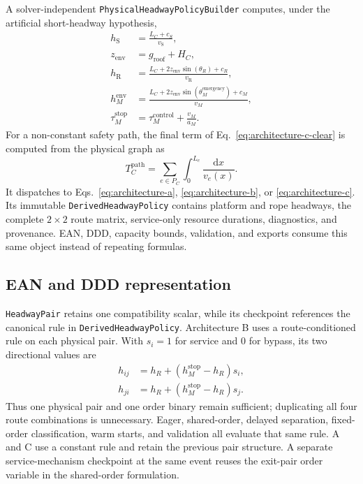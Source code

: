 \documentclass[11pt,a4paper]{scrartcl}
\newcommand{\vlinehaul}{v_{\mathrm R}}
\newcommand{\vstation}{v_{\mathrm S}}
\newcommand{\hlinehaul}{h_{\mathrm R}}
\newcommand{\hservice}{h_{\mathrm S}}
\begin{document}
A solver-independent \texttt{PhysicalHeadwayPolicyBuilder} computes, under the
artificial short-headway hypothesis,
\begin{align*}
\hservice &= \frac{L_C+c_S}{\vstation},\\
z_{\mathrm{env}} &= g_{\mathrm{roof}}+H_C,\\
\hlinehaul &= \frac{L_C+2z_{\mathrm{env}}\sin(\theta_R)+c_R}{\vlinehaul},\\
 h_M^{\mathrm{env}}
 &=\frac{L_C+2z_{\mathrm{env}}\sin(\theta_M^{\mathrm{emergency}})+c_M}{v_M},\\
\tau_M^{\mathrm{stop}}
 &=\tau_M^{\mathrm{control}}+\frac{v_M}{a_M}.
\end{align*}
For a non-constant safety path, the final term of
Eq.~\eqref{eq:architecture-c-clear} is computed from the physical graph as
\[
T_C^{\mathrm{path}}
=\sum_{e\in P_C}\int_0^{L_e}\frac{\mathrm dx}{v_e(x)}.
\]
It dispatches to Eqs.~\eqref{eq:architecture-a},
\eqref{eq:architecture-b}, or \eqref{eq:architecture-c}.  Its immutable
\texttt{DerivedHeadwayPolicy} contains platform and rope headways, the complete
$2\times2$ route matrix, service-only resource durations, diagnostics, and
provenance.  EAN, DDD, capacity bounds, validation, and exports consume this
same object instead of repeating formulas.

\subsection{EAN and DDD representation}

\texttt{HeadwayPair} retains one compatibility scalar, while its checkpoint
references the canonical rule in \texttt{DerivedHeadwayPolicy}.  Architecture B
uses a route-conditioned rule on each physical pair.  With $s_i=1$
for service and $0$ for bypass, its two directional values are
\begin{align*}
h_{ij}&=h_R+(h_M^{\mathrm{stop}}-h_R)s_i,\\
h_{ji}&=h_R+(h_M^{\mathrm{stop}}-h_R)s_j.
\end{align*}
Thus one physical pair and one order binary remain sufficient; duplicating all
four route combinations is unnecessary.  Eager, shared-order, delayed
separation, fixed-order classification, warm starts, and validation all
evaluate that same rule.  A and C use a constant rule and retain the previous
pair structure.  A separate service-mechanism checkpoint at the same event
reuses the exit-pair order variable in the shared-order formulation.
\end{document}
